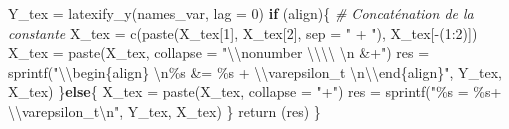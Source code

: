 \documentclass[
  10pt,
]{article}
\newenvironment{Shaded}{\begin{snugshade}}{\end{snugshade}}
\newcommand{\AttributeTok}[1]{\textcolor[rgb]{0.77,0.63,0.00}{#1}}
\newcommand{\CommentTok}[1]{\textcolor[rgb]{0.56,0.35,0.01}{\textit{#1}}}
\newcommand{\ControlFlowTok}[1]{\textcolor[rgb]{0.13,0.29,0.53}{\textbf{#1}}}
\newcommand{\DecValTok}[1]{\textcolor[rgb]{0.00,0.00,0.81}{#1}}
\newcommand{\FunctionTok}[1]{\textcolor[rgb]{0.00,0.00,0.00}{#1}}
\newcommand{\NormalTok}[1]{#1}
\newcommand{\OtherTok}[1]{\textcolor[rgb]{0.56,0.35,0.01}{#1}}
\newcommand{\SpecialCharTok}[1]{\textcolor[rgb]{0.00,0.00,0.00}{#1}}
\newcommand{\StringTok}[1]{\textcolor[rgb]{0.31,0.60,0.02}{#1}}
\begin{document}
\begin{Shaded}
\begin{Highlighting}[]
\NormalTok{    Y\_tex }\OtherTok{=} \FunctionTok{latexify\_y}\NormalTok{(names\_var, }\AttributeTok{lag =} \DecValTok{0}\NormalTok{)}
    \ControlFlowTok{if}\NormalTok{ (align)\{}
        \CommentTok{\# Concaténation de la constante}
\NormalTok{        X\_tex }\OtherTok{=} \FunctionTok{c}\NormalTok{(}\FunctionTok{paste}\NormalTok{(X\_tex[}\DecValTok{1}\NormalTok{], X\_tex[}\DecValTok{2}\NormalTok{], }\AttributeTok{sep =} \StringTok{" + "}\NormalTok{),}
\NormalTok{                  X\_tex[}\SpecialCharTok{{-}}\NormalTok{(}\DecValTok{1}\SpecialCharTok{:}\DecValTok{2}\NormalTok{)])}
\NormalTok{        X\_tex }\OtherTok{=} \FunctionTok{paste}\NormalTok{(X\_tex,}
                      \AttributeTok{collapse =} \StringTok{"}\SpecialCharTok{\textbackslash{}\textbackslash{}}\StringTok{nonumber }\SpecialCharTok{\textbackslash{}\textbackslash{}\textbackslash{}\textbackslash{}}\StringTok{ }\SpecialCharTok{\textbackslash{}n}\StringTok{ \&+"}\NormalTok{)}
\NormalTok{        res }\OtherTok{=} \FunctionTok{sprintf}\NormalTok{(}\StringTok{"}\SpecialCharTok{\textbackslash{}\textbackslash{}}\StringTok{begin\{align\} }\SpecialCharTok{\textbackslash{}n}\StringTok{\%s \&= \%s + }\SpecialCharTok{\textbackslash{}\textbackslash{}}\StringTok{varepsilon\_t }\SpecialCharTok{\textbackslash{}n\textbackslash{}\textbackslash{}}\StringTok{end\{align\}"}\NormalTok{,}
\NormalTok{                      Y\_tex, X\_tex)}
\NormalTok{    \}}\ControlFlowTok{else}\NormalTok{\{}
\NormalTok{        X\_tex }\OtherTok{=} \FunctionTok{paste}\NormalTok{(X\_tex,}
                      \AttributeTok{collapse =} \StringTok{"+"}\NormalTok{)}
\NormalTok{        res }\OtherTok{=} \FunctionTok{sprintf}\NormalTok{(}\StringTok{"\%s = \%s+ }\SpecialCharTok{\textbackslash{}\textbackslash{}}\StringTok{varepsilon\_t}\SpecialCharTok{\textbackslash{}n}\StringTok{"}\NormalTok{,}
\NormalTok{                      Y\_tex, X\_tex)}
\NormalTok{    \}}
    \FunctionTok{return}\NormalTok{ (res)}
\NormalTok{\}}


\end{Highlighting}
\end{Shaded}
\end{document}
